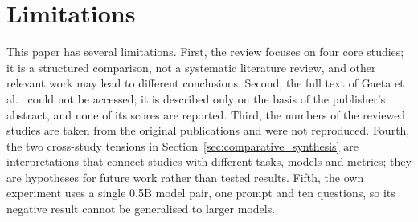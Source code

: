 \section{Limitations}
\label{sec:limitations}

This paper has several limitations. First, the review focuses on four core studies; it is a structured comparison, not a systematic literature review, and other relevant work may lead to different conclusions. Second, the full text of Gaeta et al.~\cite{gaeta2025towards} could not be accessed; it is described only on the basis of the publisher's abstract, and none of its scores are reported. Third, the numbers of the reviewed studies are taken from the original publications and were not reproduced. Fourth, the two cross-study tensions in Section~\ref{sec:comparative_synthesis} are interpretations that connect studies with different tasks, models and metrics; they are hypotheses for future work rather than tested results. Fifth, the own experiment uses a single 0.5B model pair, one prompt and ten questions, so its negative result cannot be generalised to larger models.
